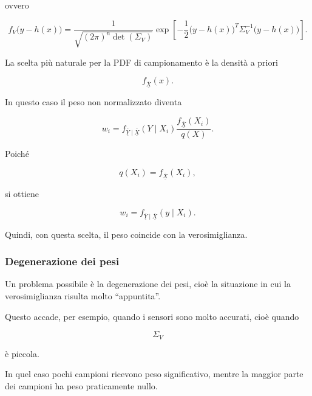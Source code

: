 \documentclass[11pt,a4paper]{article}
\begin{document}
ovvero

\[
f_V\bigl(y-h(x)\bigr)
=
\frac{1}{\sqrt{(2\pi)^n\det(\Sigma_V)}}
\exp\!\left[
-\frac{1}{2}
\bigl(y-h(x)\bigr)^T
\Sigma_V^{-1}
\bigl(y-h(x)\bigr)
\right].
\]

La scelta più naturale per la PDF di campionamento è la densità a priori

\[
f_{\overline{\underline{X}}}(x).
\]

In questo caso il peso non normalizzato diventa

\[
w_i
=
f_{\overline{\underline{Y}}\mid \overline{\underline{X}}}(Y\mid X_i)
\frac{f_{\overline{\underline{X}}}(X_i)}{q(X)}.
\]

Poiché

\[
q(X_i)=f_{\overline{\underline{X}}}(X_i),
\]

si ottiene

\[
w_i
=
f_{\overline{\underline{Y}}\mid \overline{\underline{X}}}(y\mid X_i).
\]

Quindi, con questa scelta, il peso coincide con la verosimiglianza.

\subsubsection*{Degenerazione dei pesi}

Un problema possibile è la degenerazione dei pesi, cioè la situazione in cui la verosimiglianza risulta molto ``appuntita''.

Questo accade, per esempio, quando i sensori sono molto accurati, cioè quando

\[
\Sigma_V
\]

è piccola.

In quel caso pochi campioni ricevono peso significativo, mentre la maggior parte dei campioni ha peso praticamente nullo.
\end{document}
